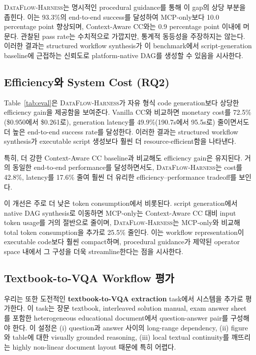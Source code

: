 \textsc{DataFlow-Harness}는 명시적인 procedural guidance를 통해 이 gap의 상당 부분을 좁힌다. 이는 93.3\%의 end-to-end success를 달성하여 MCP-only보다 10.0 percentage point 향상되며, Context-Aware CC와는 0.9 percentage point 이내에 머문다. 관찰된 pass rate는 수치적으로 가깝지만, 통계적 동등성을 주장하지는 않는다. 이러한 결과는 structured workflow synthesis가 이 benchmark에서 script-generation baseline에 근접하는 신뢰도로 platform-native DAG를 생성할 수 있음을 시사한다.

\subsection{Efficiency와 System Cost (\textbf{RQ2})}
Table~\ref{tab:eval}은 \textsc{DataFlow-Harness}가 자유 형식 code generation보다 상당한 efficiency gain을 제공함을 보여준다. Vanilla CC와 비교하면 monetary cost를 72.5\%(\$0.950에서 \$0.261로), generation latency를 49.9\%(190.7s에서 95.5s로) 줄이면서도 더 높은 end-to-end success rate를 달성한다. 이러한 결과는 structured workflow synthesis가 executable script 생성보다 훨씬 더 resource-efficient함을 나타낸다.

특히, 더 강한 Context-Aware CC baseline과 비교해도 efficiency gain은 유지된다. 거의 동일한 end-to-end performance를 달성하면서도, \textsc{DataFlow-Harness}는 cost를 42.8\%, latency를 17.6\% 줄여 훨씬 더 유리한 efficiency--performance tradeoff를 보인다.

이 개선은 주로 더 낮은 token consumption에서 비롯된다. script generation에서 native DAG synthesis로 이동하면 MCP-only는 Context-Aware CC 대비 input token usage를 거의 절반으로 줄이며, \textsc{DataFlow-Harness}는 MCP-only와 비교해 total token consumption을 추가로 25.5\% 줄인다. 이는 workflow representation이 executable code보다 훨씬 compact하며, procedural guidance가 제약된 operator space 내에서 그 구성을 더욱 streamline한다는 점을 시사한다.

\subsection{Textbook-to-VQA Workflow 평가}

우리는 또한 도전적인 \textbf{textbook-to-VQA extraction} task에서 시스템을 추가로 평가한다. 이 task는 장문 textbook, interleaved solution manual, exam answer sheet를 포함한 heterogeneous educational document에서 question-answer pair를 구성해야 한다. 이 설정은 (i) question과 answer 사이의 long-range dependency, (ii) figure와 table에 대한 visually grounded reasoning, (iii) local textual continuity를 깨뜨리는 highly non-linear document layout 때문에 특히 어렵다.

